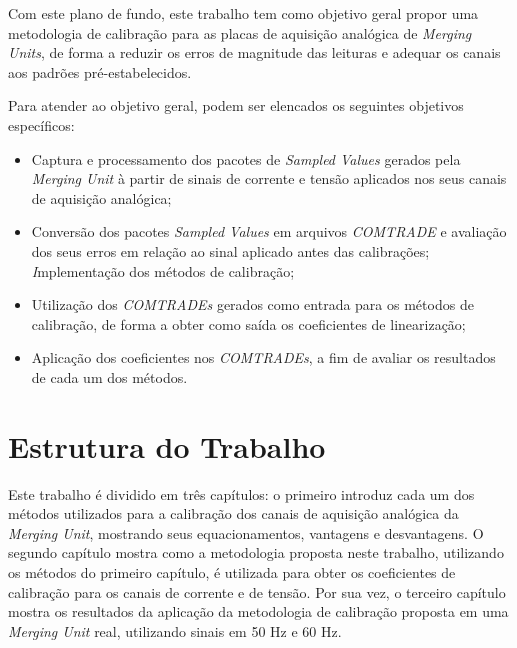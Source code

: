 Com este plano de fundo, este trabalho tem como objetivo geral propor uma metodologia de calibração para as placas de aquisição analógica de \textit{Merging Units}, de forma a reduzir os erros de magnitude das leituras e adequar os canais aos padrões pré-estabelecidos.

Para atender ao objetivo geral, podem ser elencados os seguintes objetivos específicos:

\begin{itemize}
    \item Captura e processamento dos pacotes de \textit{Sampled Values} \cite{IEC61850-9-2} gerados pela \textit{Merging Unit} à partir de sinais de corrente e tensão aplicados nos seus canais de aquisição analógica;
    \item Conversão dos pacotes \textit{Sampled Values} em arquivos \textit{COMTRADE} \cite{comtrade1992} e avaliação dos seus erros em relação ao sinal aplicado antes das calibrações;
    \textit Implementação dos métodos de calibração;
    \item Utilização dos \textit{COMTRADEs} gerados como entrada para os métodos de calibração, de forma a obter como saída os coeficientes de linearização;
    \item Aplicação dos coeficientes nos \textit{COMTRADEs}, a fim de avaliar os resultados de cada um dos métodos.
\end{itemize}


\section{Estrutura do Trabalho}

Este trabalho é dividido em três capítulos: o primeiro introduz cada um dos métodos utilizados para a calibração dos canais de aquisição analógica da \textit{Merging Unit}, mostrando seus equacionamentos, vantagens e desvantagens. O segundo capítulo mostra como a metodologia proposta neste trabalho, utilizando os métodos do primeiro capítulo, é utilizada para obter os coeficientes de calibração para os canais de corrente e de tensão. Por sua vez, o terceiro capítulo mostra os resultados da aplicação da metodologia de calibração proposta em uma \textit{Merging Unit} real, utilizando sinais em 50 Hz e 60 Hz.









